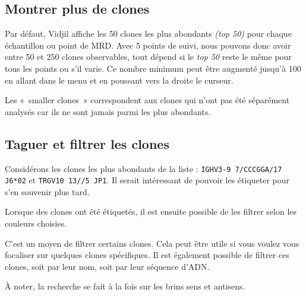 \documentclass[10pt]{article}
\begin{document}
{\subsection{Montrer plus de clones}

Par défaut, Vidjil affiche les 50 clones les plus abondants \textit{(top 50)}
pour chaque échantillon ou point de MRD. Avec 5 points de suivi, nous
pouvons donc avoir entre 50 et 250 clones observables, tout dépend si le
\textit{top 50} reste le même pour tous les points ou s'il varie.
Ce nombre
minimum peut être augmenté jusqu'à 100 en allant dans le menu  et en
poussant vers la droite le curseur.

 Les «~smaller clones~» correspondent aux clones qui n'ont
  pas été séparément analysés car ils ne sont jamais parmi les plus abondants.


\subsection{Taguer et filtrer les clones}

Considérons les clones les plus abondants de la liste :
\texttt{IGHV3-9 7/CCCGGA/17 J6*02} et \texttt{TRGV10 13//5 JP1}.
Il serait intéressant de pouvoir les étiqueter pour s'en souvenir plus tard.


Lorsque des clones ont été étiquetés, il est ensuite possible de
les filtrer selon les couleurs choisies.


C'est un moyen de filtrer certains clones. Cela peut être utile si vous
voulez vous focaliser sur quelques clones spécifiques. Il est également
possible de filtrer ces clones, soit par leur nom, soit par leur séquence
d'ADN.

À noter, la recherche se fait à la fois sur les brins sens
  et antisens.

}
\end{document}
